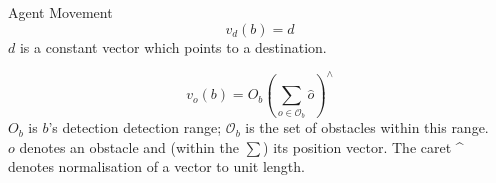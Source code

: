 \documentclass{beamer}
\begin{document}
\begin{frame}{Agent Movement}
    \begin{equation}\label{eq:Direction}
      v_d(b) = d
    \end{equation}
$d$ is a constant vector which points to a destination.

    \begin{equation}\label{eq:Obstacle2}
      v_o(b) = O_b \left(\sum_{o\in \mathcal O_b }\hat o\right)^{\!\!\wedge}
    \end{equation}
$O_b$ is $b$'s detection detection range; $\mathcal O_b$ is the set of obstacles within this range.\\
$o$ denotes an obstacle and (within the $\sum$) its position vector. The caret \^~ denotes normalisation of a vector to unit length.
\end{frame}
\end{document}
